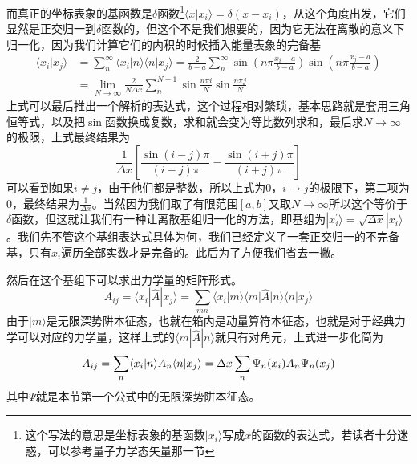 \documentclass[12pt,a4paper,openany,twoside]{book}
\numberwithin{equation}{section}
\begin{document}
        而真正的坐标表象的基函数是$\delta$函数\footnote{这个写法的意思是坐标表象的基函数$ |x_i\rangle $写成$x$的函数的表达式，若读者十分迷惑，可以参考量子力学态矢量那一节}$ \langle x | x_i \rangle =\delta(x-x_i)$，从这个角度出发，它们显然是正交归一到$\delta$函数的，但这个不是我们想要的，因为它无法在离散的意义下归一化，因为我们计算它们的内积的时候插入能量表象的完备基
        \begin{equation}
          \begin{aligned}
            \langle x_i | x_j \rangle &= \sum_n^{\infty} \langle x_i | n \rangle \langle n | x_j \rangle = \frac{2}{b-a}\sum_n^{\infty}\sin\left(n\pi\frac{x_i-a}{b-a}\right)\sin\left(n\pi\frac{x_j-a}{b-a}\right)\\
            &=\lim_{N\to \infty}\frac{2}{N\Delta x}\sum_{n}^{N-1}\sin\frac{n\pi i}{N}\sin\frac{n\pi j}{N}
          \end{aligned}
        \end{equation}
        上式可以最后推出一个解析的表达式，这个过程相对繁琐，基本思路就是套用三角恒等式，以及把$\sin$函数换成复数，求和就会变为等比数列求和，最后求$N\to \infty$的极限，上式最终结果为
        \begin{equation}
          \frac{1}{\Delta x}\left[\frac{\sin (i-j)\pi}{(i-j)\pi}-\frac{\sin(i+j)\pi}{(i+j)\pi}\right]
        \end{equation}
        可以看到如果$i\neq j$，由于他们都是整数，所以上式为$0$，$i\to j$的极限下，第二项为$0$，最终结果为$\frac{1}{\Delta x}$。当然因为我们取了有限范围$[a,b]$又取$N\to \infty$所以这个等价于$\delta$函数，但这就让我们有一种让离散基组归一化的方法，即基组为$ | x_i^{\prime} \rangle = \sqrt{\Delta x} | x_i \rangle$。我们先不管这个基组表达式具体为何，我们已经定义了一套正交归一的不完备基，只有$x_i$遍历全部实数才是完备的。此后为了方便我们省去一撇。

        然后在这个基组下可以求出力学量的矩阵形式。
        \begin{equation}
          A_{ij}=\langle x_i | \hat{A} | x_j \rangle = \sum_{mn} \langle x_i | m \rangle \langle m | \hat{A} | n \rangle \langle n | x_j \rangle 
        \end{equation}
        由于$ | m \rangle $是无限深势阱本征态，也就在箱内是动量算符本征态，也就是对于经典力学可以对应的力学量，这样上式的$ \langle m | \hat{A} | n \rangle $就只有对角元，上式进一步化简为
        \begin{equation}
          A_{ij} = \sum_{n} \langle x_i | n \rangle A_n \langle n | x_j \rangle \\=\Delta x \sum_{n} \Psi_n(x_i) A_n \Psi_n(x_j)
        \end{equation}
        其中$\Psi$就是本节第一个公式中的无限深势阱本征态。
\end{document}
